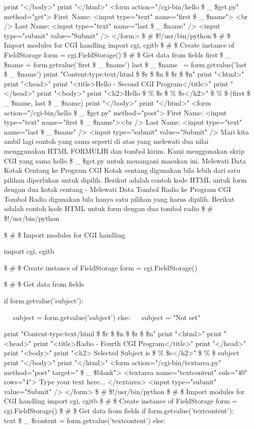 \begin{12pt}
\begin{12pt}
print "</body>" 
print "</html>" 
<form action="/cgi-bin/hello \$  \_  \$get.py" method="get"> 
First~Name: <input type="text" name="first \$  \_  \$name">  <br /> 
Last Name: <input type="text" name="last \$  \_  \$name" /> 
<input type="submit" value="Submit" />
</form>
\vspace{12pt}
 \$  \#  \$!/usr/bin/python 
 \$  \#  \$ Import modules for CGI handling  
import cgi, cgitb  
 \$  \#  \$ Create instance of FieldStorage 
form = cgi.FieldStorage()  
 \$  \#  \$ Get data from fields
first \$  \_  \$name = form.getvalue('first \$  \_  \$name') 
last \$  \_  \$name~ = form.getvalue('last \$  \_  \$name') 
print "Content-type:text/html \$  \setminus  \$r \$  \setminus  \$n \$  \setminus  \$r \$  \setminus  \$n"
print "<html>"
print "<head>" 
print "<title>Hello - Second CGI Program</title>" 
print "</head>" 
print "<body>" 
print "<h2>Hello  \$  \%  \$s  \$  \%  \$s</h2>" \$  \%  \$ (first \$  \_  \$name, last \$  \_  \$name) 
print "</body>" 
print "</html>" 
<form action="/cgi-bin/hello \$  \_  \$get.py" method="post"> 
First Name: <input type="text" name="first \$  \_  \$name"><br /> 
Last Name: <input type="text" name="last \$  \_  \$name" /> 
<input type="submit" value="Submit" /> 
Mari kita ambil lagi contoh yang sama seperti di atas yang melewati dua nilai menggunakan HTML FORMULIR dan tombol kirim. Kami menggunakan skrip CGI yang sama hello \$  \_  \$get.py untuk menangani masukan ini. 
Melewati Data Kotak Centang ke Program CGI 
Kotak centang digunakan bila lebih dari satu pilihan diperlukan untuk dipilih. 
Berikut adalah contoh kode HTML untuk form dengan dua kotak centang - 
Melewati Data Tombol Radio ke Program CGI 
Tombol Radio digunakan bila hanya satu pilihan yang harus dipilih. 
Berikut adalah contoh kode HTML untuk form dengan dua tombol radio  
 \$  \#  \$!/usr/bin/python 

 \$  \#  \$ Import modules for CGI handling  

import cgi, cgitb 

 \$  \#  \$ Create instance of FieldStorage  
\noindent 
form = cgi.FieldStorage()  

 \$  \#  \$ Get data from fields

if form.getvalue('subject'): 

~~ subject = form.getvalue('subject') 
else: 
~~ subject = "Not set" 

print "Content-type:text/html \$  \setminus  \$r \$  \setminus  \$n \$  \setminus  \$r \$  \setminus  \$n" 
print "<html>" 
print "<head>" 
print "<title>Radio - Fourth CGI Program</title>" 
print "</head>"
print "<body>" 
print "<h2> Selected Subject is  \$  \%  \$s</h2>"  \$  \%  \$ subject 
print "</body>" 
print "</html>" 
<form action="/cgi-bin/textarea.py" method="post" target=" \$  \_  \$blank"> 
<textarea name="textcontent" cols="40" rows="4"> 
Type your text here... 
</textarea> 
<input type="submit" value="Submit" /> 
</form>  
 \$  \#  \$!/usr/bin/python 
 \$  \#  \$ Import modules for CGI handling  
import cgi, cgitb  
  \$  \#  \$ Create instance of FieldStorage  
form = cgi.FieldStorage()  
 \$  \#  \$ Get data from fields 
if form.getvalue('textcontent'): 
~~ text \$  \_  \$content = form.getvalue('textcontent') 
else: 


\end{12pt}
\end{12pt}
